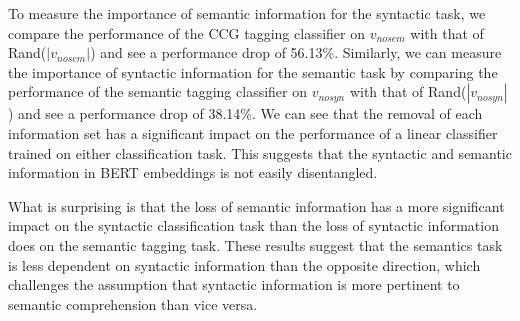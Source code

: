 \documentclass[11pt,a4paper]{article}
\begin{document}
To measure the importance of semantic information for the syntactic task, we compare the performance of the CCG tagging classifier on $v_{nosem}$ with that of Rand($|v_{nosem}|$) and see a performance drop of 56.13\%. Similarly, we can measure the importance of syntactic information for the semantic task by comparing the performance of the semantic tagging classifier on $v_{nosyn}$ with that of Rand($|v_{nosyn}|$) and see a performance drop of 38.14\%. We can see that the removal of each information set has a significant impact on the performance of a linear classifier trained on either classification task. This suggests that the syntactic and semantic information in BERT embeddings is not easily disentangled. 

What is surprising is that the loss of semantic information has a more significant impact on the syntactic classification task than the loss of syntactic information does on the semantic tagging task. These results suggest that the semantics task is less dependent on syntactic information than the opposite direction, which challenges the assumption that syntactic information is more pertinent to semantic comprehension than vice versa. 




\end{document}
